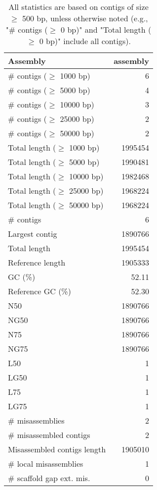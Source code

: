 \documentclass[12pt,a4paper]{article}
\begin{document}
\begin{table}[ht]
\begin{center}
\caption{All statistics are based on contigs of size $\geq$ 500 bp, unless otherwise noted (e.g., "\# contigs ($\geq$ 0 bp)" and "Total length ($\geq$ 0 bp)" include all contigs).}
\begin{tabular}{|l*{1}{|r}|}
\hline
Assembly & assembly \\ \hline
\# contigs ($\geq$ 1000 bp) & 6 \\ \hline
\# contigs ($\geq$ 5000 bp) & 4 \\ \hline
\# contigs ($\geq$ 10000 bp) & 3 \\ \hline
\# contigs ($\geq$ 25000 bp) & 2 \\ \hline
\# contigs ($\geq$ 50000 bp) & 2 \\ \hline
Total length ($\geq$ 1000 bp) & 1995454 \\ \hline
Total length ($\geq$ 5000 bp) & 1990481 \\ \hline
Total length ($\geq$ 10000 bp) & 1982468 \\ \hline
Total length ($\geq$ 25000 bp) & 1968224 \\ \hline
Total length ($\geq$ 50000 bp) & 1968224 \\ \hline
\# contigs & 6 \\ \hline
Largest contig & 1890766 \\ \hline
Total length & 1995454 \\ \hline
Reference length & 1905333 \\ \hline
GC (\%) & 52.11 \\ \hline
Reference GC (\%) & 52.30 \\ \hline
N50 & 1890766 \\ \hline
NG50 & 1890766 \\ \hline
N75 & 1890766 \\ \hline
NG75 & 1890766 \\ \hline
L50 & 1 \\ \hline
LG50 & 1 \\ \hline
L75 & 1 \\ \hline
LG75 & 1 \\ \hline
\# misassemblies & 2 \\ \hline
\# misassembled contigs & 2 \\ \hline
Misassembled contigs length & 1905010 \\ \hline
\# local misassemblies & 1 \\ \hline
\# scaffold gap ext. mis. & 0 \\ \hline

\end{tabular}
\end{center}
\end{table}
\end{document}

